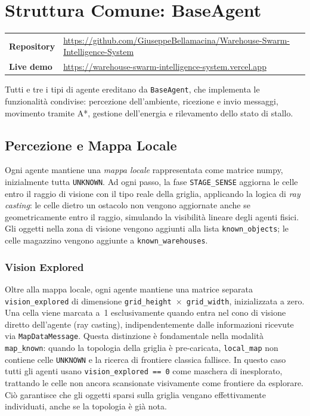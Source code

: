 \chapter{Struttura Comune: BaseAgent}

\noindent
\begin{tabular}{@{}l@{\quad}l@{}}
  \textbf{Repository} & \url{https://github.com/GiuseppeBellamacina/Warehouse-Swarm-Intelligence-System} \\
  \textbf{Live demo}  & \url{https://warehouse-swarm-intelligence-system.vercel.app}
\end{tabular}
\bigskip

Tutti e tre i tipi di agente ereditano da \texttt{BaseAgent}, che implementa le funzionalit\`a
condivise: percezione dell'ambiente, ricezione e invio messaggi, movimento tramite A*,
gestione dell'energia e rilevamento dello stato di stallo.

\section{Percezione e Mappa Locale}

Ogni agente mantiene una \textit{mappa locale} rappresentata come matrice numpy, inizialmente
tutta \texttt{UNKNOWN}. Ad ogni passo, la fase \texttt{STAGE\_SENSE} aggiorna le celle entro
il raggio di visione con il tipo reale della griglia, applicando la logica di \textit{ray
casting}: le celle dietro un ostacolo non vengono aggiornate anche se geometricamente entro
il raggio, simulando la visibilit\`a lineare degli agenti fisici. Gli oggetti nella zona di
visione vengono aggiunti alla lista \texttt{known\_objects}; le celle magazzino vengono
aggiunte a \texttt{known\_warehouses}.

\subsection{Vision Explored}

Oltre alla mappa locale, ogni agente mantiene una matrice separata
\texttt{vision\_explored} di dimensione \texttt{grid\_height $\times$ grid\_width},
inizializzata a zero. Una cella viene marcata a~1 esclusivamente quando entra nel
cono di visione diretto dell'agente (ray casting), indipendentemente dalle informazioni
ricevute via \texttt{MapDataMessage}. Questa distinzione \`e fondamentale nella
modalit\`a \texttt{map\_known}: quando la topologia della griglia \`e pre-caricata,
\texttt{local\_map} non contiene celle \texttt{UNKNOWN} e la ricerca di frontiere
classica fallisce. In questo caso tutti gli agenti usano
\texttt{vision\_explored == 0} come maschera di inesplorato, trattando le celle
non ancora scansionate visivamente come frontiere da esplorare. Ci\`o garantisce che
gli oggetti sparsi sulla griglia vengano effettivamente individuati, anche se la
topologia \`e gi\`a nota.

